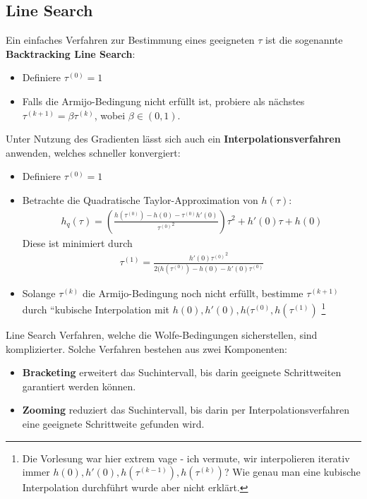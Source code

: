 \documentclass{report}
\newcommand{\tbf}{\textbf}
\newcommand{\tauk}{\tau^{(k)}}
\begin{document}
\subsection{Line Search}
Ein einfaches Verfahren zur Bestimmung eines geeigneten $\tau$ ist die sogenannte \tbf{Backtracking Line Search}:
\begin{itemize}
 \item Definiere $\tau^{(0)} = 1$
 \item Falls die Armijo-Bedingung nicht erfüllt ist, probiere als nächstes $\tau^{(k+1)} = \beta \tauk$, wobei $\beta \in (0,1)$.
\end{itemize}
Unter Nutzung des Gradienten lässt sich auch ein \tbf{Interpolationsverfahren} anwenden, welches schneller konvergiert:
\begin{itemize}
 \item Definiere $\tau^{(0)} = 1$
 \item Betrachte die Quadratische Taylor-Approximation von $h(\tau)$:
 \begin{align*}
  h_q(\tau) = \left(\frac{h(\tau^{(0)}) - h(0) - \tau^{(0)}h'(0)}{{\tau^{(0)}}^2}\right)\tau^2 + h'(0)\tau + h(0)
 \end{align*}
 Diese ist minimiert durch
 \begin{align*}
  \tau^{(1)} = \frac{h'(0) {\tau^{(0)}}^2}{2(h(\tau^{(0)}) - h(0) - h'(0)\tau^{(0)}}
 \end{align*}
 \item Solange $\tau^{(k)}$ die Armijo-Bedingung noch nicht erfüllt, bestimme $\tau^{(k+1)}$ durch ``kubische Interpolation mit $h(0), h'(0), h(\tau^{(0)}, h(\tau^{(1)})$ \footnote{Die Vorlesung war hier extrem vage - ich vermute, wir interpolieren iterativ immer $h(0), h'(0), h(\tau^{(k-1)}), h(\tau^{(k)})$? Wie genau man eine kubische Interpolation durchführt wurde aber nicht erklärt.}
\end{itemize}
Line Search Verfahren, welche die Wolfe-Bedingungen sicherstellen, sind komplizierter. Solche Verfahren bestehen aus zwei Komponenten:
\begin{itemize}
 \item \tbf{Bracketing} erweitert das Suchintervall, bis darin geeignete Schrittweiten garantiert werden können.
 \item \tbf{Zooming} reduziert das Suchintervall, bis darin per Interpolationsverfahren eine geeignete Schrittweite gefunden wird.
\end{itemize}
\end{document}

